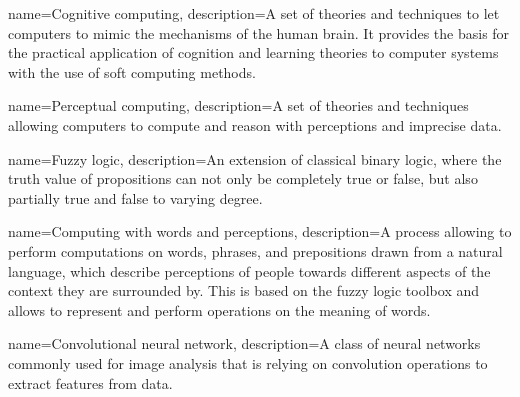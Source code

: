 {
    name={Cognitive computing},
    description={A set of theories and techniques to let computers to mimic the mechanisms of the human brain. It provides the basis for the practical application of cognition and learning theories to computer systems with the use of soft computing methods.}
}

{
    name={Perceptual computing},
    description={A set of theories and techniques allowing computers to compute and reason with perceptions and imprecise data.}
}

{
    name={Fuzzy logic},
    description={An extension of classical binary logic, where the truth value of propositions can not only be completely true or false, but also partially true and false to varying degree.}
}

{
    name={Computing with words and perceptions},
    description={A process allowing to perform computations on words, phrases, and prepositions drawn from a natural language, which describe perceptions of people towards different aspects of the context they are surrounded by. This is based on the fuzzy logic toolbox and allows to represent and perform operations on the meaning of words.}
}

{
    name={Convolutional neural network},
    description={A class of neural networks commonly used for image analysis that is relying on convolution operations to extract features from data.}
}
